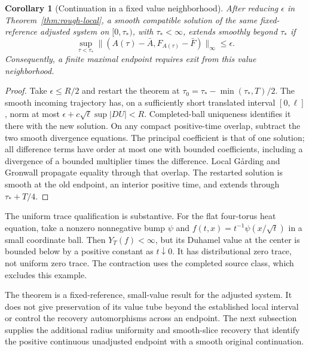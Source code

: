 \documentclass[11pt]{article}
\numberwithin{equation}{section}
\newtheorem{corollary}[theorem]{Corollary}
\theoremstyle{definition}
\theoremstyle{remark}
\begin{document}
\begin{corollary}[Continuation in a fixed value neighborhood]
\label{cor:adjusted-value-continuation}
After reducing $\epsilon$ in Theorem~\ref{thm:rough-local},
a smooth compatible solution of the same fixed-reference adjusted
system on $[0,\tau_*)$, with $\tau_*<\infty$, extends smoothly
beyond $\tau_*$ if
\[
 \sup_{\tau<\tau_*}
 \|(A(\tau)-\bar A,F_{A(\tau)}-\bar F)\|_\infty\le\epsilon.
\]
Consequently, a finite maximal endpoint requires exit from
this value neighborhood.
\end{corollary}
\begin{proof}
Take $\epsilon\le R/2$ and restart the theorem at
$\tau_0=\tau_*-\min(\tau_*,T)/2$.
The smooth incoming trajectory has, on a sufficiently short
translated interval $[0,\ell]$, norm at most
$\epsilon+c\sqrt\ell\sup|DU|<R$.
Completed-ball uniqueness identifies it there with the new
solution. On any compact positive-time overlap, subtract the
two smooth divergence equations. The principal coefficient
is that of one solution; all difference terms have order at
most one with bounded coefficients, including a divergence
of a bounded multiplier times the difference. Local Gårding
and Gronwall propagate equality through that overlap.
The restarted solution is smooth at the old endpoint, an
interior positive time, and extends through $\tau_*+T/4$.
\end{proof}

The uniform trace qualification is substantive. For the flat
four-torus heat equation, take a nonzero nonnegative bump $\psi$
and $f(t,x)=t^{-1}\psi(x/\sqrt t)$ in a small coordinate ball.
Then $Y_T(f)<\infty$, but its Duhamel value at the center is
bounded below by a positive constant as $t\downarrow0$.
It has distributional zero trace, not uniform zero trace.
The contraction uses the completed source class, which
excludes this example.

The theorem is a fixed-reference, small-value result for the
adjusted system. It does not give preservation of its value
tube beyond the established local interval or control the
recovery automorphisms across an endpoint.
The next subsection supplies the additional radius uniformity
and smooth-slice recovery that identify the positive continuous
unadjusted endpoint with a smooth original continuation.
\end{document}
